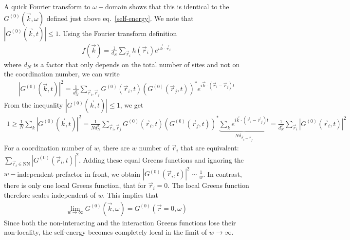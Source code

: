 \documentclass[10pt]{report}
\numberwithin{equation}{section}
\begin{document}
A quick Fourier transform to \(\omega-\)domain shows that this is identical to the \(G^{(0)}(\vec k, \omega)\) defined just above eq.~\ref{self-energy}. We note that \(|G^{(0)}(\vec k, t)| \leq 1\). Using the Fourier transform  definition
\begin{equation}\begin{aligned}
	f(\vec k) = \frac{1}{d_N}\sum_{\vec r_i}h(\vec r_i) e^{i \vec{k}\cdot\vec{r}_i}
\end{aligned}\end{equation}
where \(d_N\) is a factor that only depends on the total number of sites and not on the coordination number, we can write
\begin{equation}\begin{aligned}
	|G^{(0)}(\vec k, t)|^2 = \frac{1}{d_N^2}\sum_{\vec r_i, \vec r_j} G^{(0)}(\vec r_i, t)\left(G^{(0)}(\vec r_j, t)\right)^* e^{i \vec k \cdot \left(\vec r_i - \vec r_j\right) t}
\end{aligned}\end{equation}
From the inequality \(|G^{(0)}(\vec k, t)| \leq 1\), we get
\begin{equation}\begin{aligned}
	1 \geq \frac{1}{N}\sum_k |G^{(0)}(\vec k, t)|^2 = \frac{1}{N d_N^2}\sum_{\vec r_i, \vec r_j} G^{(0)}(\vec r_i, t)\left(G^{(0)}(\vec r_j, t)\right)^* \underbrace{\sum_k e^{i \vec k \cdot \left(\vec r_i - \vec r_j\right) t}}_{N \delta_{\vec r_i = \vec r_j}} = \frac{1}{d_N^2}\sum_{\vec r_i} |G^{(0)}(\vec r_i, t)|^2
\end{aligned}\end{equation}
For a coordination number of \(w\), there are \(w\) number of \(\vec r_i\) that are equivalent: \(\sum_{\vec r_i \in \text{NN}}|G^{(0)}(\vec r_i, t)|^2\). Adding these equal Greens functions and ignoring the \(w-\)independent prefactor in front, we obtain \(|G^{(0)}(\vec r_i, t)|^2 \sim \frac{1}{w}\). In contrast, there is only one local Greens function, that for \(\vec r_i=0\). The local Greens function therefore scales independent of \(w\). This implies that 
\begin{equation}\begin{aligned}
	\lim_{w\to \infty}G^{(0)}(\vec k,\omega) = G^{(0)}(\vec r=0,\omega)
\end{aligned}\end{equation}
Since both the non-interacting and the interaction Greens functions lose their non-locality, the self-energy becomes completely local in the limit of \(w \to \infty\).
\end{document}
